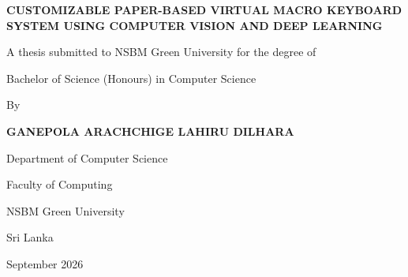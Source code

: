 \documentclass[12pt,a4paper]{report}
\begin{document}
\setcounter{page}{1}
\begin{titlepage}
    \thispagestyle{empty}
    \centering
    {\fontsize{16pt}{24pt}\selectfont \bfseries CUSTOMIZABLE PAPER-BASED VIRTUAL MACRO KEYBOARD SYSTEM USING COMPUTER VISION AND DEEP LEARNING \par}
    \vfill
    {\fontsize{14pt}{20pt}\selectfont A thesis submitted to NSBM Green University for the degree of \par}
    {\fontsize{14pt}{20pt}\selectfont Bachelor of Science (Honours) in Computer Science \par}
    \vfill
    {\fontsize{14pt}{20pt}\selectfont By \par}
    \vfill
    {\fontsize{14pt}{20pt}\selectfont \textbf{GANEPOLA ARACHCHIGE LAHIRU DILHARA} \par}
    \vfill
    {\fontsize{14pt}{20pt}\selectfont Department of Computer Science \par}
    {\fontsize{14pt}{20pt}\selectfont Faculty of Computing \par}
    {\fontsize{14pt}{20pt}\selectfont NSBM Green University \par}
    {\fontsize{14pt}{20pt}\selectfont Sri Lanka \par}
    \vfill
    {\fontsize{14pt}{20pt}\selectfont September 2026 \par}
\end{titlepage}

\setcounter{page}{2}


\newpage


\newpage


\newpage

\tableofcontents
\newpage

\listoffigures
\newpage

\listoftables
\newpage


\newpage
\end{document}
